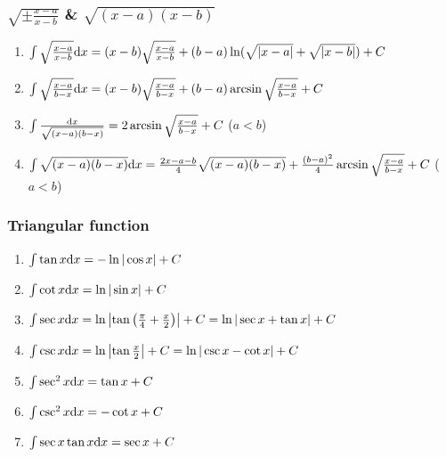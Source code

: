 \begin{tiny}
\begin{enumerate}[noitemsep]
\end{enumerate}

\subsubsection{$\sqrt{\pm\frac{x-a}{x-b}}$ \& $\sqrt{(x-a)(x-b)}$}

\begin{enumerate}[noitemsep]

\item $ \int \sqrt\frac{x-a}{x-b} \mathrm{d} x = (x-b)\sqrt\frac{x-a}{x-b} + (b-a)\ln(\sqrt{|x-a|}+\sqrt{|x-b|}) + C $

\item $ \int \sqrt\frac{x-a}{b-x} \mathrm{d} x = (x-b)\sqrt\frac{x-a}{b-x} + (b-a)\arcsin\sqrt\frac{x-a}{b-x} + C $

\item $ \int \frac{\mathrm{d} x}{\sqrt{(x-a)(b-x)}} = 2\arcsin\sqrt\frac{x-a}{b-x} + C$ ($a<b$)

\item $ \int \sqrt{(x-a)(b-x)} \mathrm{d} x = \frac{2x-a-b}{4}\sqrt{(x-a)(b-x)} + \frac{(b-a)^2}{4}\arcsin\sqrt\frac{x-a}{b-x} + C $ ($a<b$)

\end{enumerate}

\subsubsection{Triangular function}

\begin{enumerate}[noitemsep]

\item $ \int \tan x \mathrm{d} x = -\ln|\cos x| + C $

\item $ \int \cot x \mathrm{d} x = \ln |\sin x| + C $

\item $ \int \sec x \mathrm{d} x = \ln \left| \tan\left( \frac{\pi}{4} + \frac{x}{2} \right) \right| + C = \ln |\sec x + \tan x| + C $

\item $ \int \csc x \mathrm{d} x = \ln \left| \tan\frac{x}{2} \right| + C = \ln |\csc x - \cot x| + C $

\item $ \int \sec^2 x \mathrm{d} x = \tan x + C $

\item $ \int \csc^2 x \mathrm{d} x = -\cot x + C $

\item $ \int \sec x \tan x \mathrm{d} x = \sec x + C $


\end{enumerate}
\end{tiny}
